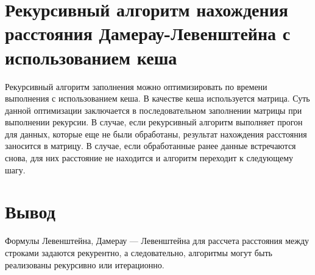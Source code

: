 \section{Рекурсивный алгоритм нахождения расстояния Дамерау-Левенштейна с использованием кеша}

Рекурсивный алгоритм заполнения можно оптимизировать по времени выполнения с использованием кеша. В качестве кеша используется матрица. Суть данной оптимизации заключается в последовательном заполнении матрицы при выполнении рекурсии. 
В случае, если рекурсивный алгоритм выполняет прогон для данных, которые еще не были обработаны, результат нахождения расстояния заносится в матрицу. В случае, если обработанные ранее данные встречаются снова, для них расстояние не находится и алгоритм переходит к следующему шагу.

\section*{Вывод}

Формулы Левенштейна, Дамерау — Левенштейна для рассчета расстояния между строками задаются рекурентно, а следовательно, алгоритмы могут быть реализованы рекурсивно или итерационно.